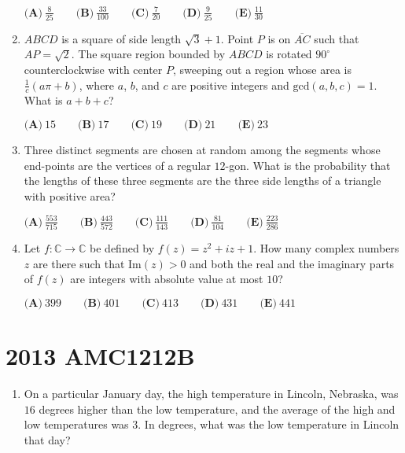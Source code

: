 \documentclass{article}
\begin{document}
\begin{enumerate}[label=\arabic*., itemsep=0.5em]
\( \textbf{(A)} \ \frac{8}{25} \qquad \textbf{(B)} \ \frac{33}{100} \qquad \textbf{(C)} \ \frac{7}{20} \qquad \textbf{(D)} \ \frac{9}{25} \qquad \textbf{(E)} \ \frac{11}{30}\)\par \vspace{0.5em}\item \( ABCD\) is a square of side length \( \sqrt{3} + 1 \). Point \( P \) is on \( \overline{AC} \) such that \( AP = \sqrt{2} \). The square region bounded by \( ABCD \) is rotated \( 90^{\circ} \) counterclockwise with center \( P \), sweeping out a region whose area is \( \frac{1}{c} (a \pi + b) \), where \(a \), \(b\), and \( c \) are positive integers and \( \text{gcd}(a,b,c) = 1 \). What is \( a + b + c \)?

\(\textbf{(A)} \ 15 \qquad \textbf{(B)} \ 17 \qquad \textbf{(C)} \ 19 \qquad \textbf{(D)} \ 21 \qquad \textbf{(E)} \ 23 \)\par \vspace{0.5em}\item Three distinct segments are chosen at random among the segments whose end-points are the vertices of a regular \(12\)-gon. What is the probability that the lengths of these three segments are the three side lengths of a triangle with positive area?

\( \textbf{(A)} \ \frac{553}{715} \qquad \textbf{(B)} \ \frac{443}{572} \qquad \textbf{(C)} \ \frac{111}{143} \qquad \textbf{(D)} \ \frac{81}{104} \qquad \textbf{(E)} \ \frac{223}{286}\)\par \vspace{0.5em}\item Let \(f : \mathbb{C} \to \mathbb{C} \) be defined by \( f(z) = z^2 + iz + 1 \). How many complex numbers \(z \) are there such that \( \text{Im}(z) > 0 \) and both the real and the imaginary parts of \(f(z)\) are integers with absolute value at most \( 10 \)?

\( \textbf{(A)} \ 399 \qquad \textbf{(B)} \ 401 \qquad \textbf{(C)} \ 413 \qquad \textbf{(D)} \ 431 \qquad \textbf{(E)} \ 441 \)\par \vspace{0.5em}\end{enumerate}\newpage\section*{2013 AMC1212B}\begin{enumerate}[label=\arabic*., itemsep=0.5em]\item On a particular January day, the high temperature in Lincoln, Nebraska, was \(16\) degrees higher than the low temperature, and the average of the high and low temperatures was \(3\). In degrees, what was the low temperature in Lincoln that day?


\end{enumerate}
\end{document}

